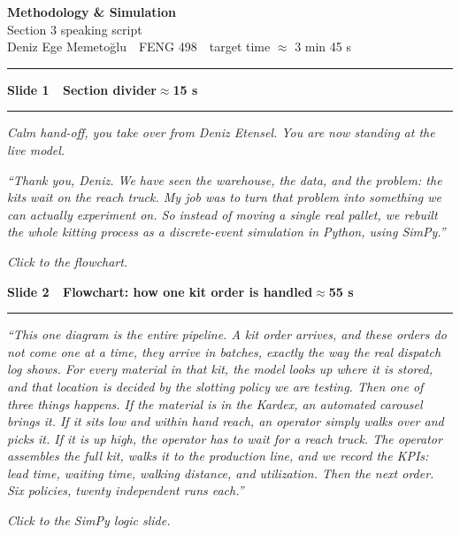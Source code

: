 \documentclass[11pt]{article}
\newcommand{\slidehdr}[2]{%
  \par\medskip
  {\color{navy}\large\bfseries #1}\hfill{\color{green}\bfseries #2}\par
  {\color{navy}\rule{\linewidth}{1.1pt}}\par\smallskip}
\newcommand{\cue}[1]{\par{\color{grey}\small\itshape #1}\par\smallskip}
\newenvironment{say}{\par\begingroup\fontsize{12.5}{16}\selectfont\itshape}{\endgroup\par\medskip}
\begin{document}
\thispagestyle{empty}

\begin{center}
  {\color{navy}\LARGE\bfseries Methodology \& Simulation}\\[2pt]
  {\large Section 3 speaking script}\\[4pt]
  {\color{grey} Deniz Ege Memeto\u{g}lu \,\textbullet\, FENG 498 \,\textbullet\, target time \(\approx\) 3 min 45 s}
\end{center}
\medskip
{\color{navy}\rule{\linewidth}{1.5pt}}

\slidehdr{Slide 1 \,\textbullet\, Section divider}{\(\approx\)15 s}
\cue{Calm hand-off, you take over from Deniz Etensel. You are now standing at the live model.}
\begin{say}
``Thank you, Deniz. We have seen the warehouse, the data, and the problem: the kits
wait on the reach truck. My job was to turn that problem into something we can actually
experiment on. So instead of moving a single real pallet, we rebuilt the whole kitting
process as a discrete-event simulation in Python, using SimPy.''
\end{say}
\cue{Click to the flowchart.}

\slidehdr{Slide 2 \,\textbullet\, Flowchart: how one kit order is handled}{\(\approx\)55 s}
\begin{say}
``This one diagram is the entire pipeline. A kit order arrives, and these orders do
not come one at a time, they arrive in batches, exactly the way the real dispatch log
shows. For every material in that kit, the model looks up where it is stored, and that
location is decided by the slotting policy we are testing. Then one of three things
happens. If the material is in the Kardex, an automated carousel brings it. If it sits
low and within hand reach, an operator simply walks over and picks it. If it is up
high, the operator has to wait for a reach truck. The operator assembles the full kit,
walks it to the production line, and we record the KPIs: lead time, waiting time,
walking distance, and utilization. Then the next order. Six policies, twenty
independent runs each.''
\end{say}
\cue{Click to the SimPy logic slide.}
\end{document}

